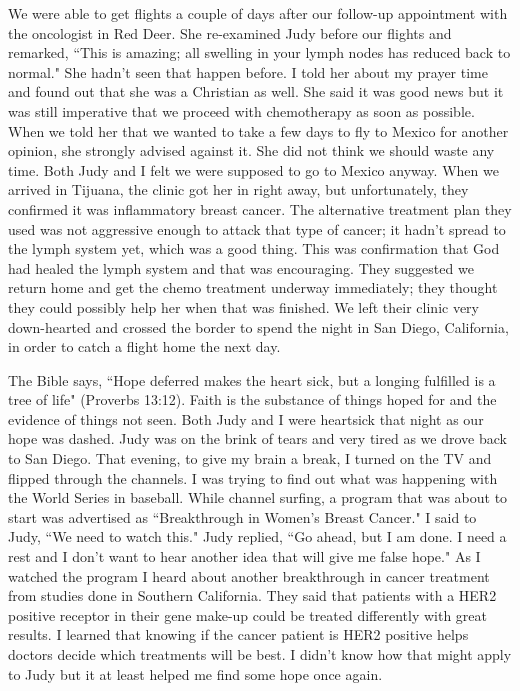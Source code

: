 \documentclass[oneside,12pt]{book}
\begin{document}
We were able to get flights a couple of days after our follow-up appointment with the oncologist in Red Deer. She re-examined Judy before our flights and remarked, ``This is amazing; all swelling in your lymph nodes has reduced back to normal." She hadn't seen that happen before. I told her about my prayer time and found out that she was a Christian as well. She said it was good news but it was still imperative that we proceed with chemotherapy as soon as possible. When we told her that we wanted to take a few days to fly to Mexico for another opinion, she strongly advised against it. She did not think we should waste any time. Both Judy and I felt we were supposed to go to Mexico anyway. When we arrived in Tijuana, the clinic got her in right away, but unfortunately, they confirmed it was inflammatory breast cancer. The alternative treatment plan they used was not aggressive enough to attack that type of cancer; it hadn't spread to the lymph system yet, which was a good thing. This was confirmation that God had healed the lymph system and that was encouraging. They suggested we return home and get the chemo treatment underway immediately; they thought they could possibly help her when that was finished. We left their clinic very down-hearted and crossed the border to spend the night in San Diego, California, in order to catch a flight home the next day. 

The Bible says, ``Hope deferred makes the heart sick, but a longing fulfilled is a tree of life" (Proverbs 13:12). Faith is the substance of things hoped for and the evidence of things not seen. Both Judy and I were heartsick that night as our hope was dashed. Judy was on the brink of tears and very tired as we drove back to San Diego. That evening, to give my brain a break, I turned on the TV and flipped through the channels. I was trying to find out what was happening with the World Series in baseball. While channel surfing, a program that was about to start was advertised as ``Breakthrough in Women's Breast Cancer." I said to Judy, ``We need to watch this." Judy replied, ``Go ahead, but I am done. I need a rest and I don't want to hear another idea that will give me false hope."  As I watched the program I heard about another breakthrough in cancer treatment from studies done in Southern California. They said that patients with a HER2 positive receptor in their gene make-up could be treated differently with great results. I learned that knowing if the cancer patient is HER2 positive helps doctors decide which treatments will be best. I didn't know how that might apply to Judy but it at least helped me find some hope once again.
\end{document}
